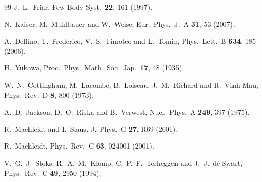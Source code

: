 \documentclass[aps,rmp,nofootinbib,twocolumn,floatfix]{revtex4}
\begin{document}
\begin{thebibliography}{99}
  J.~L.~Friar,
  Few Body Syst.\  {\bf 22}, 161 (1997).

  N.~Kaiser, M.~Muhlbauer and W.~Weise,
  Eur.\ Phys.\ J.\  A {\bf 31}, 53 (2007).

  A.~Delfino, T.~Frederico, V.~S.~Timoteo and L.~Tomio,
  Phys.\ Lett.\  B {\bf 634}, 185 (2006).


  H.~Yukawa,
  Proc.\ Phys.\ Math.\ Soc.\ Jap.\  {\bf 17}, 48 (1935).

  W.~N.~Cottingham, M.~Lacombe, B.~Loiseau, J.~M.~Richard and R.~Vinh Mau,
  Phys.\ Rev.\  D {\bf 8}, 800 (1973).

  A.~D.~Jackson, D.~O.~Riska and B.~Verwest,
  Nucl.\ Phys.\  A {\bf 249}, 397 (1975).


  R.~Machleidt and I.~Slaus, 
  J.\ Phys.\ G {\bf 27}, R69 (2001).

  R.~Machleidt,
  Phys.\ Rev.\  C {\bf 63}, 024001 (2001).

  V.~G.~J.~Stoks, R.~A.~M.~Klomp, C.~P.~F.~Terheggen and J.~J.~de Swart,
  Phys.\ Rev.\  C {\bf 49}, 2950 (1994).


\end{thebibliography}
\end{document}
